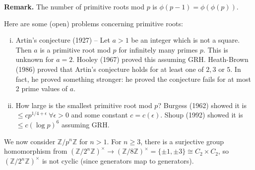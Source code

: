 \documentclass{article}
\theoremstyle{definition}
\begin{document}

\textbf{Remark.} The number of primitive roots mod $p$ is $\phi(p-1)=\phi(\phi(p))$.
\vspace{1mm}

Here are some (open) problems concerning primitive roots:
\begin{enumerate}[(i)]
    \item Artin's conjecture (1927) -- Let $a>1$ be an integer which is not a square. Then $a$ is a primitive root mod $p$ for infinitely many primes $p$. This is unknown for $a=2$. Hooley (1967) proved this assuming GRH. Heath-Brown (1986) proved that Artin's conjecture holds for at least one of $2,3$ or $5$. In fact, he proved something stronger: he proved the conjecture fails for at most 2 prime values of $a$.   
    \item How large is the smallest primitive root mod $p$? Burgess (1962) showed it is $\le c p^{1/4 + \epsilon} ~\forall  \epsilon>0$ and some constant $c=c(\epsilon)$. Shoup (1992) showed it is $\le c(\log p)^6$ assuming GRH.
\end{enumerate}

We now consider $\mathbb{Z}/p^n\mathbb{Z}$ for $n>1$. For $n \ge 3$, there is a surjective group homomorphism from $(\mathbb{Z}/2^n\mathbb{Z})^{\times} \to (\mathbb{Z}/8\mathbb{Z})^{\times} = \{\pm 1, \pm3\} \cong C_2 \times C_2$, so $(\mathbb{Z}/2^{n}\mathbb{Z})^{\times}$ is not cyclic (since generators map to generators).
\end{document}
